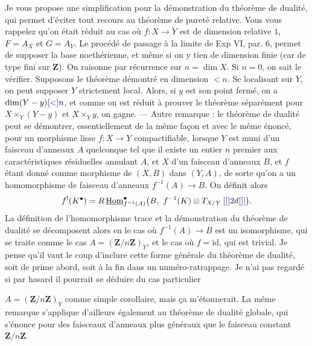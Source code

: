 \documentclass[11pt,a4paper]{article}
\begin{document}
Je vous propose une simplification pour la démonstration du théorème de
dualité, qui permet d'éviter tout recours au théorème de pureté relative.
Vous vous rappelez qu'on était réduit au cas où $f : X \to Y$ est de
dimension relative $1$, $F = A_X$ et $G = A_Y$. Le procédé  de passage à la limite de Exp VI, par. 6, permet de supposer
la base noethérienne, et même si on y tien de dimension finie (car de
type fini sur $\mathbf{Z}$). On raisonne par récurrence sur $n = \dim X$. Si
$n = 0$, on sait le vérifier. Supposons le théorème démontré en dimension
$< n$. Se localisant sur $Y$, on peut supposer $Y$ strictement local. Alors,
si $y$ est son point fermé, on a $\dim(Y - y) \supplied{<} n$, et comme on est
réduit à prouver le théorème séparément pour $X \times_Y (Y - y)$ et $X
\times_Y y$, on gagne. --- Autre remarque : le théorème de dualité peut se
démontrer, essentiellement de la même façon et avec le même énoncé, pour un
morphisme lisse $f : X \to Y$ compactifiable, lorsque $Y$ est muni d'un
faisceau d'anneaux $A$ quelconque tel que il existe un entier $n$ premier aux
caractéristiques résiduelles annulant $A$, et $X$ d'un faisceau d'anneaux
$B$, et $f$ étant donné comme morphisme de $(X, B)$ dans $(Y, A)$, de sorte
qu'on a un homomorphisme de faisceau d'anneaux $f^{-1}(A) \to B$. On définit
alors
\[
f^{!}(K^{\bullet}) = R\,\underline{\mathrm{Hom}}^{\bullet}_{f^{-1}(A)}
\bigl(B,\ f^{-1}(K) \otimes T_{X/Y}\,\supplied{[}2d\supplied{]}\bigr) .
\]
La définition de l'homomorphisme trace et la démonstration du théorème de
dualité se décomposent alors en le cas où $f^{-1}(A) \to B$ est un
isomorphisme, qui se traite comme le cas $A = (\mathbf{Z}/n\mathbf{Z})_Y$, et
le cas où $f = \mathrm{id}$, qui est trivial. Je pense qu'il vaut le coup
d'inclure cette forme générale du théorème de dualité, soit de prime abord,
soit à la fin dans un numéro-ratrappage. Je n'ai pas regardé si
par hasard il pourrait se déduire du cas particulier


$A = (\mathbf{Z}/n\mathbf{Z})_Y$ comme simple corollaire, mais ça
m'étonnerait. La même remarque s'applique d'ailleurs également au théorème de
dualité globale, qui s'énonce pour des faisceaux d'anneaux plus généraux que
le faisceau constant $\mathbf{Z}/n\mathbf{Z}$.
\end{document}
